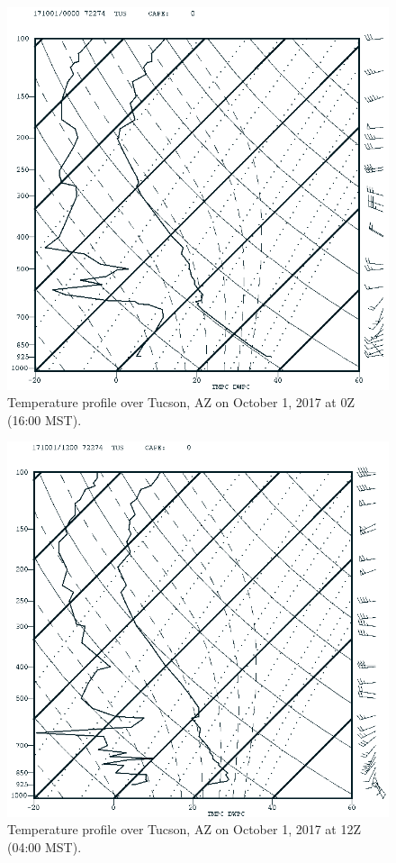\documentclass[11pt]{article}
\begin{document}
\begin{figure}[h!]
  \centering
  \includegraphics[width=\textwidth]{TUSTempProfile0Z.png}
  \caption{Temperature profile over Tucson, AZ on October 1, 2017 at 0Z (16:00 MST).}
  \label{fig:TUS0Z}
\end{figure}

\begin{figure}[h!]
  \centering
  \includegraphics[width=\textwidth]{TUSTempProfile12Z.png}
  \caption{Temperature profile over Tucson, AZ on October 1, 2017 at 12Z (04:00 MST).}
  \label{fig:TUS12Z}
\end{figure}
\end{document}
